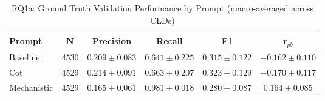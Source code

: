 \begin{table}[htbp]
\centering
\caption{RQ1a: Ground Truth Validation Performance by Prompt (macro-averaged across CLDs)}
\label{tab:rq1a_gt_by_prompt}
\begin{tabular}{lccccc}
\toprule
\textbf{Prompt} & \textbf{N} & \textbf{Precision} & \textbf{Recall} & \textbf{F1} & \textbf{r$_{pb}$} \\
\midrule
Baseline & 4530 & $0.209 \pm 0.083$ & $0.641 \pm 0.225$ & $0.315 \pm 0.122$ & $-0.162 \pm 0.110$ \\
Cot & 4529 & $0.214 \pm 0.091$ & $0.663 \pm 0.207$ & $0.323 \pm 0.129$ & $-0.170 \pm 0.117$ \\
Mechanistic & 4529 & $0.165 \pm 0.061$ & $0.981 \pm 0.018$ & $0.280 \pm 0.087$ & $0.164 \pm 0.085$ \\
\bottomrule
\end{tabular}
\end{table}